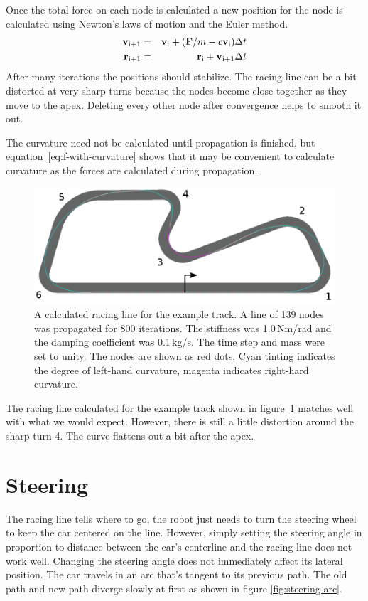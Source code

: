 \documentclass{article}
\begin{document}
Once the total force on each node is calculated a new position for the node is
calculated using Newton's laws of motion and the Euler method.
\begin{eqnarray}
  \mathbf{v}_{\mathrm{i+1}} & = & \mathbf{v}_{\mathrm{i}} + (\mathbf{F}/m - c \mathbf{v}_{\mathrm{i}}) \Delta t \\
  \mathbf{r}_{\mathrm{i+1}} & = & \mathbf{r}_{\mathrm{i}} + \mathbf{v}_{\mathrm{i+1}} \Delta t
\end{eqnarray}
After many iterations the positions should stabilize.  The racing line can be a
bit distorted at very sharp turns because the nodes become close together as
they move to the apex.  Deleting every other node after convergence helps to
smooth it out.

The curvature need not be calculated until propagation is finished, but
equation~\ref{eq:f-with-curvature} shows that it may be convenient to calculate
curvature as the forces are calculated during propagation.

\begin{figure}
  \centering
  \includegraphics[width=12cm]{racing-line.png}  
  \caption{A calculated racing line for the example track.  A line of 139 nodes
    was propagated for 800 iterations.  The stiffness was 1.0\,Nm/rad and the
    damping coefficient was 0.1\,kg/s.  The time step and mass were set to
    unity.  The nodes are shown as red dots.  Cyan tinting indicates the degree
    of left-hand curvature, magenta indicates right-hard curvature.}
  \label{fig:racing-line}
\end{figure}

The racing line calculated for the example track shown in
figure~\ref{fig:racing-line} matches well with what we would expect.  However,
there is still a little distortion around the sharp turn 4.  The curve flattens
out a bit after the apex.

\section{Steering}
The racing line tells where to go, the robot just needs to turn the steering
wheel to keep the car centered on the line.  However, simply setting the
steering angle in proportion to distance between the car's centerline and the
racing line does not work well.  Changing the steering angle does not
immediately affect its lateral position.  The car travels in an arc that's
tangent to its previous path.  The old path and new path diverge slowly at
first as shown in figure \ref{fig:steering-arc}.
\end{document}
